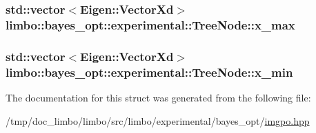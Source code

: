 \subsubsection[{\texorpdfstring{x\+\_\+max}{x_max}}]{\setlength{\rightskip}{0pt plus 5cm}std\+::vector$<$Eigen\+::\+Vector\+Xd$>$ limbo\+::bayes\+\_\+opt\+::experimental\+::\+Tree\+Node\+::x\+\_\+max}\hypertarget{structlimbo_1_1bayes__opt_1_1experimental_1_1_tree_node_a3948f2f233995ce1cd4b36d3944b27b9}{}\label{structlimbo_1_1bayes__opt_1_1experimental_1_1_tree_node_a3948f2f233995ce1cd4b36d3944b27b9}
\subsubsection[{\texorpdfstring{x\+\_\+min}{x_min}}]{\setlength{\rightskip}{0pt plus 5cm}std\+::vector$<$Eigen\+::\+Vector\+Xd$>$ limbo\+::bayes\+\_\+opt\+::experimental\+::\+Tree\+Node\+::x\+\_\+min}\hypertarget{structlimbo_1_1bayes__opt_1_1experimental_1_1_tree_node_a09ee8e7b77c04a859ecdc253329303f4}{}\label{structlimbo_1_1bayes__opt_1_1experimental_1_1_tree_node_a09ee8e7b77c04a859ecdc253329303f4}


The documentation for this struct was generated from the following file\+:\begin{DoxyCompactItemize}
\item 
/tmp/doc\+\_\+limbo/limbo/src/limbo/experimental/bayes\+\_\+opt/\hyperlink{imgpo_8hpp}{imgpo.\+hpp}\end{DoxyCompactItemize}
